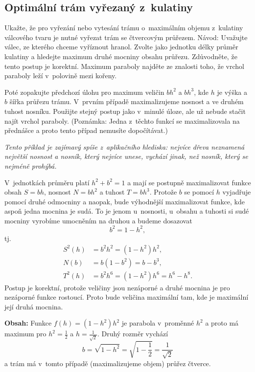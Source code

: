 \konec



\stranka

\subsection{Optimální trám vyřezaný z kulatiny}
Ukažte, že pro vyřezání nebo vytesání trámu o maximálním objemu z kulatiny válcového tvaru je nutné vyřezat trám se čtvercovým
průřezem. Návod: Uvažujte válec, ze kterého chceme vyříznout
hranol. Zvolte jako jednotku délky průměr kulatiny a hledejte maximum
druhé mocniny obsahu průřezu. Zdůvodněte, že tento postup je
korektní. Maximum paraboly najděte ze znalosti toho, že vrchol
paraboly leží v polovině mezi kořeny.

Poté zopakujte předchozí úlohu pro maximum veličin $bh^2$ a $bh^3$, kde $h$
je výška a $b$ šířka průřezu trámu. V prvním případě maximalizujeme
nosnost a ve druhém tuhost nosníku. Použijte stejný postup jako v minulé úloze, ale už nebude stačit najít vrchol paraboly. (Poznámka: Jedna z těchto funkcí se maximalizovala na přednášce a proto tento případ nemusíte dopočítávat.)

\textit{Tento příklad je zajímavý spíše z aplikačního hlediska: nejvíce dřeva neznamená největší nosnost a nosník, který nejvíce unese, vychází jinak, než nosník, který se nejméně prohýbá.}

\reseni

V jednotkách průměru platí $h^2+b^2=1$
a mají se postupně maximalizovat funkce obsah $S=bh$, nosnost $N=bh^2$ a tuhost $T=bh^3$. Protože $b$ se pomocí $h$ vyjadřuje pomocí druhé odmocniny a naopak, bude výhodnější maximalizovat funkce, kde aspoň jedna mocnina je sudá. To je jenom u nosnosti, u obsahu a tuhosti si sudé mocniny vyrobíme umocněním na druhou a budeme dosazovat $$b^2=1-h^2,$$ tj.
$$
\begin{aligned}
S^2(h)&=b^2h^2=(1-h^2)h^2,\\
N(b)&=b(1-b^2)=b-b^3,\\
T^2(h)&=b^2h^6=(1-h^2)h^6=h^6-h^8.
\end{aligned}
$$
Postup je korektní, protože veličiny jsou nezáporné a druhé mocnina je pro nezáporné funkce rostoucí. Proto bude veličina maximální tam, kde je maximální její druhá mocnina.

\textbf{Obsah: }Funkce $f(h)=(1-h^2)h^2$ je parabola v proměnné $h^2$ a proto má maximum pro $h^2=\frac 12$ a $h=\frac {1}{\sqrt 2}$. Druhý rozměr vychází
$$b=\sqrt{1-h^2}=\sqrt{1-\frac 12}=\frac{1}{\sqrt 2}$$ a trám má v tomto případě (maximalizujeme objem) průřez čtverce.

